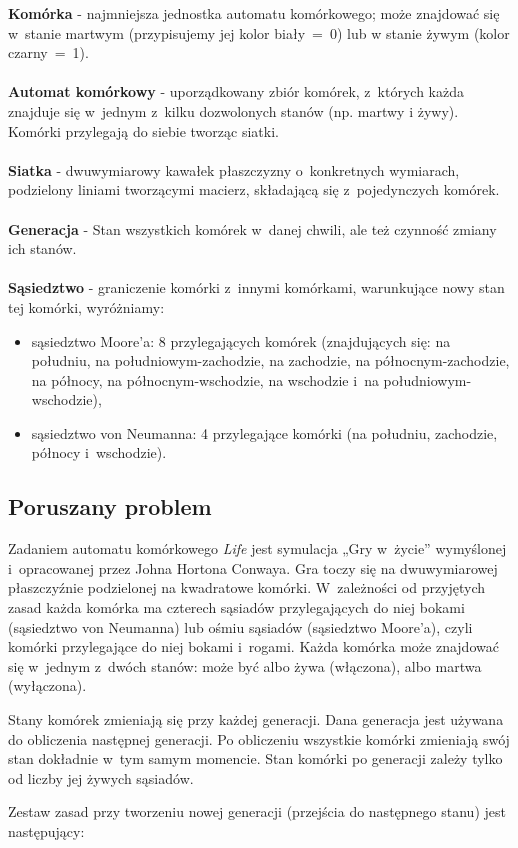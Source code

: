 \documentclass[a4paper,12pt,oneside]{article}
\begin{document}
\noindent   \textbf{Komórka} - najmniejsza jednostka automatu komórkowego; może znajdować się w~stanie martwym (przypisujemy jej kolor biały~=~0) lub w stanie żywym (kolor czarny~=~1).
\\\\
\textbf{Automat komórkowy} - uporządkowany zbiór komórek, z~których każda znajduje się w~jednym z~kilku dozwolonych stanów (np. martwy i żywy). Komórki przylegają do siebie tworząc siatki.
\\\\
\textbf{Siatka} - dwuwymiarowy kawałek płaszczyzny o~konkretnych wymiarach, podzielony liniami tworzącymi macierz, składającą się z~pojedynczych komórek.
\\\\
\textbf{Generacja} - Stan wszystkich komórek w~danej chwili, ale też czynność zmiany ich stanów.
\\\\
\textbf{Sąsiedztwo} - graniczenie komórki z~innymi komórkami, warunkujące nowy stan tej komórki, wyróżniamy: \newline
\begin{itemize}
\item sąsiedztwo Moore'a: 8 przylegających komórek (znajdujących się: na południu, na południowym-zachodzie, na zachodzie, na północnym-zachodzie, na północy, na północnym-wschodzie, na wschodzie i~na południowym-wschodzie),
\item sąsiedztwo von Neumanna: 4 przylegające komórki (na południu, zachodzie, północy i~wschodzie).
\end{itemize}

\subsection{Poruszany problem}
Zadaniem automatu komórkowego \textit{Life} jest symulacja „Gry w~życie” wymyślonej i~opracowanej przez Johna Hortona Conwaya. Gra toczy się na dwuwymiarowej płaszczyźnie podzielonej na kwadratowe komórki. W~zależności od przyjętych zasad każda komórka ma czterech sąsiadów przylegających do niej bokami (sąsiedztwo von Neumanna) lub ośmiu sąsiadów (sąsiedztwo Moore'a), czyli komórki przylegające do niej bokami i~rogami. Każda komórka może znajdować się w~jednym z~dwóch stanów: może być albo żywa (włączona), albo martwa (wyłączona).
\par Stany komórek zmieniają się przy każdej generacji. Dana generacja jest używana do obliczenia następnej generacji. Po obliczeniu wszystkie komórki zmieniają swój stan dokładnie w~tym samym momencie. Stan komórki po generacji zależy tylko od liczby jej żywych sąsiadów.
\par Zestaw zasad przy tworzeniu nowej generacji (przejścia do następnego stanu) jest następujący:
\end{document}
